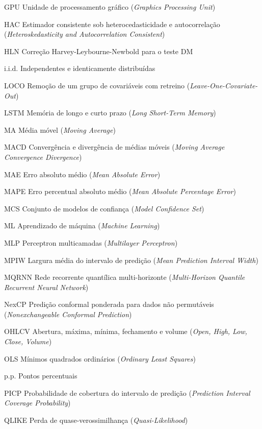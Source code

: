 \begin{siglas}
    \item[GPU] Unidade de processamento gráfico (\textit{Graphics Processing Unit})
    \item[HAC] Estimador consistente sob heterocedasticidade e autocorrelação (\textit{Heteroskedasticity and Autocorrelation Consistent})
    \item[HLN] Correção Harvey-Leybourne-Newbold para o teste DM
    \item[i.i.d.] Independentes e identicamente distribuídas
    \item[LOCO] Remoção de um grupo de covariáveis com retreino (\textit{Leave-One-Covariate-Out})
    \item[LSTM] Memória de longo e curto prazo (\textit{Long Short-Term Memory})
    \item[MA] Média móvel (\textit{Moving Average})
    \item[MACD] Convergência e divergência de médias móveis (\textit{Moving Average Convergence Divergence})
    \item[MAE] Erro absoluto médio (\textit{Mean Absolute Error})
    \item[MAPE] Erro percentual absoluto médio (\textit{Mean Absolute Percentage Error})
    \item[MCS] Conjunto de modelos de confiança (\textit{Model Confidence Set})
    \item[ML] Aprendizado de máquina (\textit{Machine Learning})
    \item[MLP] Perceptron multicamadas (\textit{Multilayer Perceptron})
    \item[MPIW] Largura média do intervalo de predição (\textit{Mean Prediction Interval Width})
    \item[MQRNN] Rede recorrente quantílica multi-horizonte (\textit{Multi-Horizon Quantile Recurrent Neural Network})
    \item[NexCP] Predição conformal ponderada para dados não permutáveis (\textit{Nonexchangeable Conformal Prediction})
    \item[OHLCV] Abertura, máxima, mínima, fechamento e volume (\textit{Open, High, Low, Close, Volume})
    \item[OLS] Mínimos quadrados ordinários (\textit{Ordinary Least Squares})
    \item[p.p.] Pontos percentuais
    \item[PICP] Probabilidade de cobertura do intervalo de predição (\textit{Prediction Interval Coverage Probability})
    \item[QLIKE] Perda de quase-verossimilhança (\textit{Quasi-Likelihood})

\end{siglas}
